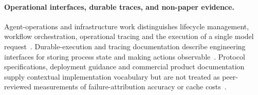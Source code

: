 \paragraph{Operational interfaces, durable traces, and non-paper evidence.}
Agent-operations and infrastructure work distinguishes lifecycle management, workflow orchestration, operational tracing and the execution of a single model request~\cite{ext012,ext013,ext017,ext032,ext034,ext041,ext044}.
Durable-execution and tracing documentation describe engineering interfaces for storing process state and making actions observable~\cite{ext116,ext117,ext121,ext122,ext131,ext132}.
Protocol specifications, deployment guidance and commercial product documentation supply contextual implementation vocabulary but are not treated as peer-reviewed measurements of failure-attribution accuracy or cache costs~\cite{ext140,ext048,ext119,ext127,ext129,ext130}.

